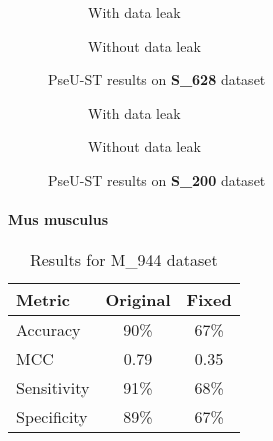         \begin{figure}[H]
            \centering
            \begin{subfigure}{0.47\textwidth}
              \centering
              \resizebox{\textwidth}{!}{}
              \captionsetup{justification=centering}
              \caption{With data leak}
            \end{subfigure}%
            \hspace{0.05\textwidth}
            \begin{subfigure}{0.47\textwidth}
              \centering
              \resizebox{\textwidth}{!}{}
              \captionsetup{justification=centering}
              \caption{Without data leak}
            \end{subfigure}
            \caption{PseU-ST results on \textbf{S\_628} dataset}\label{fig:pseu-st_s628}
        \end{figure}

        \begin{figure}[H]
            \centering
            \begin{subfigure}{0.45\textwidth}
              \centering
              \resizebox{\textwidth}{!}{}
              \captionsetup{justification=centering}
              \caption{With data leak}
            \end{subfigure}%
            \hspace{0.05\textwidth}
            \begin{subfigure}{0.45\textwidth}
              \centering
              \resizebox{\textwidth}{!}{}
              \captionsetup{justification=centering}
              \caption{Without data leak}
            \end{subfigure}
            \caption{PseU-ST results on \textbf{S\_200} dataset}\label{fig:pseu-st_s200}
        \end{figure}

      \paragraph{Mus musculus}
        \noindent
        \begin{table}[H]
            \centering
            \begin{tabular}{lcc}
              \toprule
              \textbf{Metric} & \textbf{Original} & \textbf{Fixed} \\
              \midrule
              Accuracy        & 90\%              & 67\%           \\
              MCC             & 0.79              & 0.35           \\
              Sensitivity     & 91\%              & 68\%           \\
              Specificity     & 89\%              & 67\%           \\
              \bottomrule
            \end{tabular}
            \caption{Results for M\_944 dataset}
            \label{tab:pseu-st_pstnpss_mm}
        \end{table}

